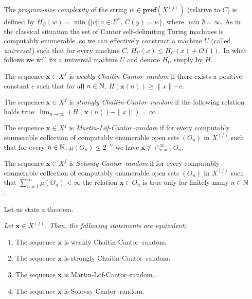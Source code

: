 \documentclass[12pt]{iopart}
\begin{document}
The {\em program-size complexity} of the string
$w\in{{\mathbf{pref}({{X^{(f)}}})}}$ (relative to $C$)
is  defined by $H_C(w)=\min \{|v| :  v \in \Sigma^*, \ C(y)=w\}$,
where $\min \emptyset = \infty$. As in the classical situation
the set of Cantor self-delimiting Turing machines is computably enumerable,
so we can effectively construct  a  machine $U$ (called  {\em universal}\,)
such
that  for every  machine
$C$, $H_U (x) \leq H_C (x) + O(1)$.
In what follows we will fix a universal machine $U$ and denote $H_U$ simply
by $H$.



The sequence ${\mathbf x} \in X^{f}$ is {\it weakly Chaitin-Cantor--random} if there
exists
a positive constant $c$ such that for all $n\in {\Bbb N}$,  $H({\mathbf x}(n)) \ge
\parallel x \parallel -c$.


The sequence ${\mathbf x} \in X^{f}$ is {\it strongly Chaitin-Cantor--random} if the
following relation holds true:  $\lim_{n
\to \infty} (H({\mathbf x}(n)) - \parallel x \parallel) = \infty$.



The sequence ${\mathbf x} \in X^{f}$ is {\it Martin-L\" of-Cantor--random} if   for
every computably enumerable collection of computably enumerable open sets
$(O_n)$ in ${X^{(f)}}$ such that for every $n\in {\Bbb N}$,  $\mu (O_n)
\le 2^{-n}$ we have ${\mathbf x} \not\in \cap_{n=1}^{\infty} O_n$.


The sequence ${\mathbf x} \in X^{f}$ is {\it Solovay-Cantor--random} if   for every
computably enumerable collection of computably enumerable open sets $(O_n)$
in ${X^{(f)}}$ such that $\sum_{n=1}^{\infty}\mu (O_n) < \infty$ the relation  ${\mathbf x}
\in  O_n$ is true only for finitely many $n\in{\Bbb N}$.




Let us state a theorem.
{\it Let ${\mathbf x} \in{X^{(f)}}$. Then, the following statements are equivalent:
\begin{enumerate}
\item The sequence ${\mathbf x}$ is
weakly Chaitin-Cantor--random.
\item The sequence ${\mathbf x}$ is strongly Chaitin-Cantor--random.
\item The sequence ${\mathbf x}$ is
Martin-L\" of-Cantor--random.
\item The sequence ${\mathbf x}$ is Solovay-Cantor--random.
\end{enumerate}
}
\end{document}
